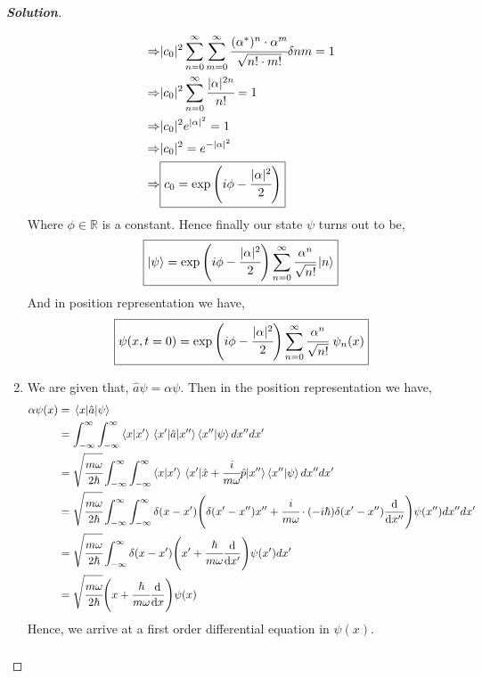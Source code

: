 \documentclass[10pt]{scrartcl}
\theoremstyle{definition}
\newenvironment{solution} {\begin{proof}[\normalfont \textbf{Solution}]} {\end{proof}}
\newcommand{\rn}{\mathbb{R}}
\newcommand*{\Op}{\hat{p}}
\newcommand*{\Ox}{\hat{x}}
\newcommand*{\Oa}{\hat{a}}
\begin{document}
\begin{solution}
\begin{enumerate}[label=(\alph*)]
\begin{align*}
                \Rightarrow &|c_0|^2 \sum_{n = 0}^{\infty} \sum_{m = 0}^{\infty} \cfrac{(\alpha^*)^n \cdot \alpha^m}{\sqrt{n! \cdot m!}} \delta{nm}  = 1\\
                \Rightarrow &|c_0|^2 \sum_{n = 0}^{\infty} \cfrac{|\alpha|^{2n}}{n!} = 1\\
                \Rightarrow &|c_0|^2 e^{|\alpha|^2} = 1 \\ 
                \Rightarrow &|c_0|^2 = e^{-|\alpha|^2} \\
                \Rightarrow &\boxed{c_0 = \exp\qty(i\phi - \cfrac{|\alpha|^2}{2})}
            \end{align*}
            Where $\phi \in \rn$ is a constant. Hence finally our state $\psi$ turns out to be, 
            $$\boxed{\ket\psi = \exp\qty(i\phi - \cfrac{|\alpha|^2}{2}) \sum_{n = 0}^{\infty} \cfrac{\alpha^n}{\sqrt{n!}}\ket n}$$
            And in position representation we have,
            $$\boxed{\psi(x, t = 0) = \exp\qty(i\phi - \cfrac{|\alpha|^2}{2}) \sum_{n = 0}^{\infty} \cfrac{\alpha^n}{\sqrt{n!}} ~ \psi_n(x)}$$
        \item We are given that, $\Oa \psi = \alpha \psi$. Then in the position representation we have,
            \begin{align*}
                \alpha \psi(x) &= \mel{x}{\Oa}{\psi}\\ 
                               &= \int_{-\infty}^\infty \int_{-\infty}^\infty \ip{x}{x'}\mel{x'}{\Oa}{x''}\ip{x''}{\psi} dx'' dx' \\ 
                               &= \sqrt{\cfrac{m\omega}{2\hbar}}\int_{-\infty}^\infty \int_{-\infty}^\infty \ip{x}{x'}\mel{x'}{\Ox + \cfrac{i}{m\omega}\Op}{x''}\ip{x''}{\psi} dx'' dx' \\ 
                               &= \sqrt{\cfrac{m\omega}{2\hbar}}\int_{-\infty}^\infty \int_{-\infty}^\infty \delta(x - x')\qty(\delta(x'-x'')x'' + \cfrac{i}{m\omega}\cdot \qty(-i\hbar) \delta(x'-x'')\dv{x''})\psi(x'') dx'' dx' \\ 
                               &= \sqrt{\cfrac{m\omega}{2\hbar}}\int_{-\infty}^\infty \delta(x -x')\qty(x' + \cfrac{\hbar}{m\omega}\dv{x'})\psi(x') dx' \\ 
                               &= \sqrt{\cfrac{m\omega}{2\hbar}}\qty(x + \cfrac{\hbar}{m\omega}\dv{x})\psi(x) \\ 
            \end{align*}
            Hence, we arrive at a first order differential equation in $\psi(x)$.
            \begin{align*}

\end{align*}
\end{enumerate}
\end{solution}
\end{document}
